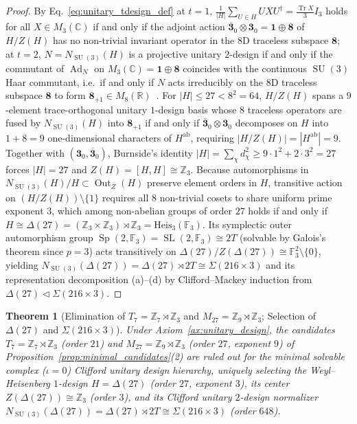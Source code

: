 \documentclass[11pt,a4paper]{article}
\newtheorem{theorem}{Theorem}[section]
\theoremstyle{definition}
\theoremstyle{remark}
\newcommand{\R}{\mathbb{R}}
\newcommand{\C}{\mathbb{C}}
\newcommand{\Z}{\mathbb{Z}}
\newcommand{\F}{\mathbb{F}}
\newcommand{\Tr}{\operatorname{Tr}}
\newcommand{\SU}{\operatorname{SU}}
\newcommand{\SL}{\operatorname{SL}}
\begin{document}
\begin{proof}
By Eq.~\eqref{eq:unitary_tdesign_def} at $t = 1$, $\frac{1}{|H|}\sum_{U \in H} U X U^\dagger = \frac{\Tr X}{3}I_3$ holds for all $X \in M_3(\C)$ if and only if the adjoint action $\overline{\mathbf{3}}_0 \otimes \mathbf{3}_0 = \mathbf{1} \oplus \mathbf{8}$ of $H/Z(H)$ has no non-trivial invariant operator in the $8$D traceless subspace $\mathbf{8}$; at $t = 2$, $N = N_{\SU(3)}(H)$ is a projective unitary $2$-design if and only if the commutant of $\operatorname{Ad}_N$ on $M_3(\C) = \mathbf{1} \oplus \mathbf{8}$ coincides with the continuous $\SU(3)$ Haar commutant, i.e.\ if and only if $N$ acts irreducibly on the $8$D traceless subspace $\mathbf{8}$ to form $\mathbf{8}_{+1} \in M_8(\R)$~\cite{Gross2007}. For $|H| \le 27 < 8^2 = 64$, $H/Z(H)$ spans a $9$-element trace-orthogonal unitary $1$-design basis whose $8$ traceless operators are fused by $N_{\SU(3)}(H)$ into $\mathbf{8}_{+1}$ if and only if $\overline{\mathbf{3}}_0 \otimes \mathbf{3}_0$ decomposes on $H$ into $1 + 8 = 9$ one-dimensional characters of $H^{\mathrm{ab}}$, requiring $|H/Z(H)| = |H^{\mathrm{ab}}| = 9$. Together with $(\mathbf{3}_0, \overline{\mathbf{3}}_0)$, Burnside's identity $|H| = \sum_{\chi} d_\chi^2 \ge 9\cdot 1^2 + 2\cdot 3^2 = 27$ forces $|H| = 27$ and $Z(H) = [H,H] \cong \Z_3$. Because automorphisms in $N_{\SU(3)}(H)/H \subset \operatorname{Out}_Z(H)$ preserve element orders in $H$, transitive action on $(H/Z(H))\setminus\{1\}$ requires all $8$ non-trivial cosets to share uniform prime exponent $3$, which among non-abelian groups of order $27$ holds if and only if $H \cong \Delta(27) = (\Z_3 \times \Z_3) \rtimes \Z_3 = \mathrm{Heis}_3(\F_3)$. Its symplectic outer automorphism group $\operatorname{Sp}(2,\F_3) = \SL(2,\F_3) \cong 2T$ (solvable by Galois's theorem since $p = 3$) acts transitively on $\Delta(27)/Z(\Delta(27)) \cong \F_3^2 \setminus \{0\}$, yielding $N_{\SU(3)}(\Delta(27)) = \Delta(27) \rtimes 2T \cong \Sigma(216 \times 3)$ and its representation decomposition (a)--(d) by Clifford--Mackey induction from $\Delta(27) \triangleleft \Sigma(216 \times 3)$.
\end{proof}

\begin{theorem}[Elimination of $T_7 = \Z_7 \rtimes \Z_3$ and $M_{27} = \Z_9 \rtimes \Z_3$; Selection of $\Delta(27)$ and $\Sigma(216 \times 3)$]
\label{thm:t7_m27}
Under Axiom~\ref{ax:unitary_design}, the candidates $T_7 = \Z_7 \rtimes \Z_3$ (order $21$) and $M_{27} = \Z_9 \rtimes \Z_3$ (order $27$, exponent $9$) of Proposition~\ref{prop:minimal_candidates}(2) are ruled out for the minimal solvable complex ($\iota = 0$) Clifford unitary design hierarchy, uniquely selecting the Weyl--Heisenberg $1$-design $H = \Delta(27)$ (order $27$, exponent $3$), its center $Z(\Delta(27)) \cong \Z_3$ (order $3$), and its Clifford unitary $2$-design normalizer $N_{\SU(3)}(\Delta(27)) = \Delta(27) \rtimes 2T \cong \Sigma(216 \times 3)$ (order $648$).
\end{theorem}
\end{document}
